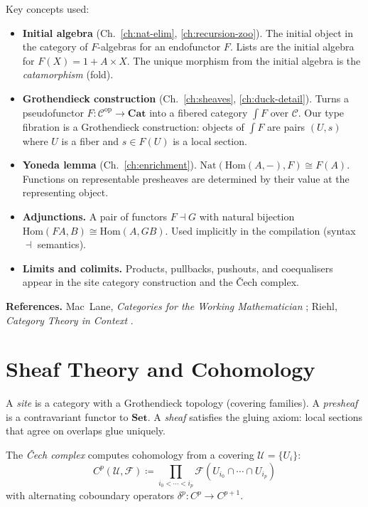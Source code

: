 \documentclass[11pt,a4paper]{report}
\theoremstyle{definition}
\theoremstyle{plain}
\newcommand{\Set}{\mathbf{Set}}
\newcommand{\Cat}{\mathbf{Cat}}
\newcommand{\presheaf}{\mathcal{F}}
\begin{document}
Key concepts used:
\begin{itemize}
  \item \textbf{Initial algebra} (Ch.~\ref{ch:nat-elim},
    \ref{ch:recursion-zoo}).
    The initial object in the category of $F$-algebras for an
    endofunctor $F$.  Lists are the initial algebra for
    $F(X) = 1 + A \times X$.  The unique morphism from the
    initial algebra is the \emph{catamorphism} (fold).

  \item \textbf{Grothendieck construction}
    (Ch.~\ref{ch:sheaves}, \ref{ch:duck-detail}).
    Turns a pseudofunctor
    $F : \mathcal{C}^{\mathrm{op}} \to \Cat$ into a fibered category
    $\int F$ over $\mathcal{C}$.  Our type fibration is a Grothendieck
    construction: objects of $\int F$ are pairs $(U, s)$ where $U$ is
    a fiber and $s \in F(U)$ is a local section.

  \item \textbf{Yoneda lemma} (Ch.~\ref{ch:enrichment}).
    $\mathrm{Nat}(\mathrm{Hom}(A, -), F)
    \cong F(A)$.  Functions on representable presheaves are determined
    by their value at the representing object.

  \item \textbf{Adjunctions.}
    A pair of functors $F \dashv G$ with natural bijection
    $\mathrm{Hom}(FA, B) \cong \mathrm{Hom}(A, GB)$.
    Used implicitly in the compilation (syntax $\dashv$ semantics).

  \item \textbf{Limits and colimits.}
    Products, pullbacks, pushouts, and coequalisers appear in the
    site category construction and the \v{C}ech complex.
\end{itemize}

\noindent
\textbf{References.}
Mac~Lane, \emph{Categories for the Working Mathematician}
\cite{maclane1971};
Riehl, \emph{Category Theory in Context} \cite{riehl2017}.

\section{Sheaf Theory and Cohomology}

A \emph{site} is a category with a Grothendieck topology (covering
families).  A \emph{presheaf} is a contravariant functor to $\Set$.
A \emph{sheaf} satisfies the gluing axiom: local sections that agree
on overlaps glue uniquely.

The \emph{\v{C}ech complex} computes cohomology from a covering
$\mathcal{U} = \{U_i\}$:
\[
  C^p(\mathcal{U}, \presheaf) \coloneqq
  \prod_{i_0 < \cdots < i_p} \presheaf(U_{i_0} \cap \cdots \cap U_{i_p})
\]
with alternating coboundary operators $\delta^p : C^p \to C^{p+1}$.
\end{document}
